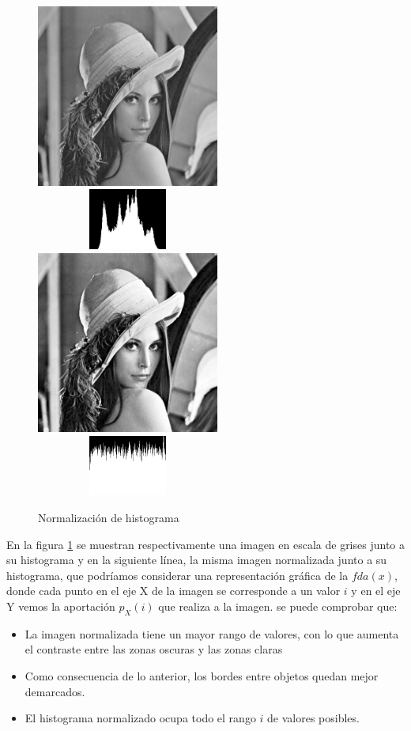 \begin{figure}[h!]
	\centering
	\includegraphics[height=6cm]{imagenes/lena_gray_256.jpg}
	\includegraphics[width=6cm, height=2cm]{imagenes/lena_gray_256_hist.png}\\
	\includegraphics[height=6cm]{imagenes/lena_gray_256_equalized.jpg}
	\includegraphics[width=6cm, height=2cm]{imagenes/lena_gray_256_equalized_hist.png}
	\caption{Normalización de histograma}
	\label{fig:normalize_hist}
\end{figure}

En la figura \ref{fig:normalize_hist} se muestran respectivamente una imagen en escala de grises junto a su histograma y en la siguiente línea, la misma imagen normalizada junto a su histograma, que podríamos considerar una representación gráfica de la $fda(x)$, donde cada punto en el eje X de la imagen se corresponde a un valor $i$ y en el eje Y vemos la aportación $p_{X}(i)$ que realiza a la imagen. se puede comprobar que:
\begin{itemize}
	\item{La imagen normalizada tiene un mayor rango de valores, con lo que aumenta el contraste entre las zonas oscuras y las zonas claras}
	\item{Como consecuencia de lo anterior, los bordes entre objetos quedan mejor demarcados.}
	\item{El histograma normalizado ocupa todo el rango $i$ de valores posibles. }
\end{itemize}

